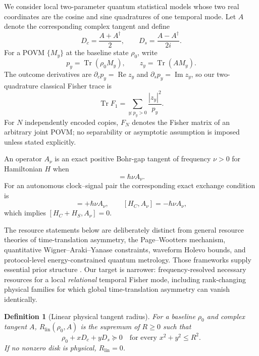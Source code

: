 \documentclass[aps,pra,preprint,nofootinbib]{revtex4-2}
\newtheorem{definition}{Definition}
\newcommand{\Tr}{\operatorname{Tr}}
\newcommand{\Rlin}{R_{\mathrm{lin}}}
\newcommand{\rhozero}{\rho_0}
\newcommand{\Fcl}{F}
\begin{document}
We consider local two-parameter quantum statistical models whose two real coordinates are the cosine and sine quadratures of one temporal mode. Let $A$ denote the corresponding complex tangent and define
\begin{equation}
D_c=\frac{A+A^\dagger}{2},\qquad
D_s=\frac{A-A^\dagger}{2i}.
\label{eq:quadratures}
\end{equation}
For a POVM $\{M_y\}$ at the baseline state $\rhozero$, write
\begin{equation}
p_y=\Tr(\rhozero M_y),\qquad z_y=\Tr(A M_y).
\end{equation}
The outcome derivatives are $\partial_c p_y=\operatorname{Re}z_y$ and $\partial_s p_y=\operatorname{Im}z_y$, so our two-quadrature classical Fisher trace is
\begin{equation}
\Tr \Fcl_1=\sum_{y:p_y>0}\frac{|z_y|^2}{p_y}.
\label{eq:FItrace}
\end{equation}
For $N$ independently encoded copies, $\Fcl_N$ denotes the Fisher matrix of an arbitrary joint POVM; no separability or asymptotic assumption is imposed unless stated explicitly.

An operator $A_\nu$ is an exact positive Bohr-gap tangent of frequency $\nu>0$ for Hamiltonian $H$ when
\begin{equation}
[H,A_\nu]=\hbar\nu A_\nu.
\label{eq:bohrgap}
\end{equation}
For an autonomous clock--signal pair the corresponding exact exchange condition is
\begin{equation}
[H_S,A_\nu]=+\hbar\nu A_\nu,
\qquad
[H_C,A_\nu]=-\hbar\nu A_\nu,
\label{eq:exchange}
\end{equation}
which implies $[H_C+H_S,A_\nu]=0$.

The resource statements below are deliberately distinct from general resource theories of time-translation asymmetry, the Page--Wootters mechanism, quantitative Wigner--Araki--Yanase constraints, waveform Holevo bounds, and protocol-level energy-constrained quantum metrology. Those frameworks supply essential prior structure \cite{PageWootters1983,MarvianSpekkens2014Modes,CarmoSoaresPinto2021,TajimaShiraishiSaito2020,Marvian2022,YamaguchiTajima2023,GardnerEtAl2024,ChenYang2026}. Our target is narrower: frequency-resolved necessary resources for a local \emph{relational} temporal Fisher mode, including rank-changing physical families for which global time-translation asymmetry can vanish identically.

\begin{definition}[Linear physical tangent radius]
For a baseline $\rhozero$ and complex tangent $A$, $\Rlin(\rhozero,A)$ is the supremum of $R\ge0$ such that
\begin{equation}
\rhozero+xD_c+yD_s\succeq0
\quad\text{for every }x^2+y^2\le R^2.
\label{eq:RlinDef}
\end{equation}
If no nonzero disk is physical, $\Rlin=0$.
\end{definition}
\end{document}
